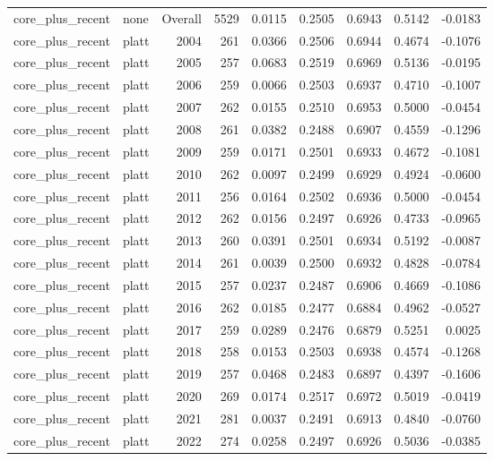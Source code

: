 \begin{table}[t]
\begin{tabular}{@{} l l r r r r r r r @{} }
      core\_plus\_recent & none & Overall & 5529 & 0.0115 & 0.2505 & 0.6943 & 0.5142 & -0.0183 \\
      core\_plus\_recent & platt & 2004 & 261 & 0.0366 & 0.2506 & 0.6944 & 0.4674 & -0.1076 \\
      core\_plus\_recent & platt & 2005 & 257 & 0.0683 & 0.2519 & 0.6969 & 0.5136 & -0.0195 \\
      core\_plus\_recent & platt & 2006 & 259 & 0.0066 & 0.2503 & 0.6937 & 0.4710 & -0.1007 \\
      core\_plus\_recent & platt & 2007 & 262 & 0.0155 & 0.2510 & 0.6953 & 0.5000 & -0.0454 \\
      core\_plus\_recent & platt & 2008 & 261 & 0.0382 & 0.2488 & 0.6907 & 0.4559 & -0.1296 \\
      core\_plus\_recent & platt & 2009 & 259 & 0.0171 & 0.2501 & 0.6933 & 0.4672 & -0.1081 \\
      core\_plus\_recent & platt & 2010 & 262 & 0.0097 & 0.2499 & 0.6929 & 0.4924 & -0.0600 \\
      core\_plus\_recent & platt & 2011 & 256 & 0.0164 & 0.2502 & 0.6936 & 0.5000 & -0.0454 \\
      core\_plus\_recent & platt & 2012 & 262 & 0.0156 & 0.2497 & 0.6926 & 0.4733 & -0.0965 \\
      core\_plus\_recent & platt & 2013 & 260 & 0.0391 & 0.2501 & 0.6934 & 0.5192 & -0.0087 \\
      core\_plus\_recent & platt & 2014 & 261 & 0.0039 & 0.2500 & 0.6932 & 0.4828 & -0.0784 \\
      core\_plus\_recent & platt & 2015 & 257 & 0.0237 & 0.2487 & 0.6906 & 0.4669 & -0.1086 \\
      core\_plus\_recent & platt & 2016 & 262 & 0.0185 & 0.2477 & 0.6884 & 0.4962 & -0.0527 \\
      core\_plus\_recent & platt & 2017 & 259 & 0.0289 & 0.2476 & 0.6879 & 0.5251 & 0.0025 \\
      core\_plus\_recent & platt & 2018 & 258 & 0.0153 & 0.2503 & 0.6938 & 0.4574 & -0.1268 \\
      core\_plus\_recent & platt & 2019 & 257 & 0.0468 & 0.2483 & 0.6897 & 0.4397 & -0.1606 \\
      core\_plus\_recent & platt & 2020 & 269 & 0.0174 & 0.2517 & 0.6972 & 0.5019 & -0.0419 \\
      core\_plus\_recent & platt & 2021 & 281 & 0.0037 & 0.2491 & 0.6913 & 0.4840 & -0.0760 \\
      core\_plus\_recent & platt & 2022 & 274 & 0.0258 & 0.2497 & 0.6926 & 0.5036 & -0.0385 \\

\end{tabular}
\end{table}
